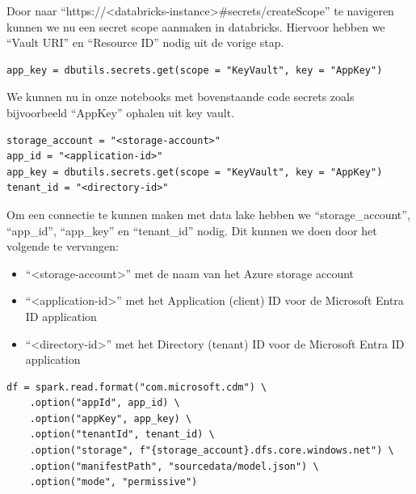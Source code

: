 Door naar ``https://<databricks-instance>\#secrets/createScope'' te navigeren kunnen we nu een secret scope aanmaken in databricks. Hiervoor hebben we ``Vault URI'' en ``Resource ID'' nodig uit de vorige stap.

\begin{verbatim}
app_key = dbutils.secrets.get(scope = "KeyVault", key = "AppKey")
\end{verbatim}

We kunnen nu in onze notebooks met bovenstaande code secrets zoals bijvoorbeeld ``AppKey'' ophalen uit key vault.



\begin{verbatim}
storage_account = "<storage-account>"
app_id = "<application-id>"
app_key = dbutils.secrets.get(scope = "KeyVault", key = "AppKey")
tenant_id = "<directory-id>"
\end{verbatim}


Om een connectie te kunnen maken met data lake hebben we ``storage\_account'', ``app\_id'', ``app\_key'' en ``tenant\_id'' nodig. Dit kunnen we doen door het volgende te vervangen:

\begin{itemize}
    \item ``<storage-account>'' met de naam van het Azure storage account
    \item ``<application-id>'' met het Application (client) ID voor de Microsoft Entra ID application
    \item ``<directory-id>'' met het Directory (tenant) ID voor de Microsoft Entra ID application
\end{itemize}



\begin{verbatim}
df = spark.read.format("com.microsoft.cdm") \
    .option("appId", app_id) \
    .option("appKey", app_key) \
    .option("tenantId", tenant_id) \
    .option("storage", f"{storage_account}.dfs.core.windows.net") \
    .option("manifestPath", "sourcedata/model.json") \
    .option("mode", "permissive")
\end{verbatim}

